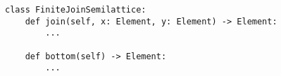\begin{verbatim}
class FiniteJoinSemilattice:
    def join(self, x: Element, y: Element) -> Element:
        ...

    def bottom(self) -> Element:
        ...
\end{verbatim}